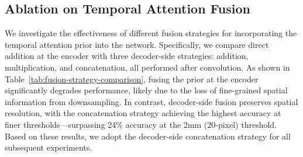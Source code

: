 \documentclass[twocolumn]{article}
\begin{document}
\subsection{Ablation on Temporal Attention Fusion}
We investigate the effectiveness of different fusion strategies for incorporating the temporal attention prior into the network. Specifically, we compare direct addition at the encoder with three decoder-side strategies: addition, multiplication, and concatenation, all performed after convolution. As shown in Table~\ref{tab:fusion-strategy-comparison}, fusing the prior at the encoder significantly degrades performance, likely due to the loss of fine-grained spatial information from downsampling. In contrast, decoder-side fusion preserves spatial resolution, with the concatenation strategy achieving the highest accuracy at finer thresholds—surpassing 24\% accuracy at the 2mm (20-pixel) threshold. Based on these results, we adopt the decoder-side concatenation strategy for all subsequent experiments.
\end{document}
